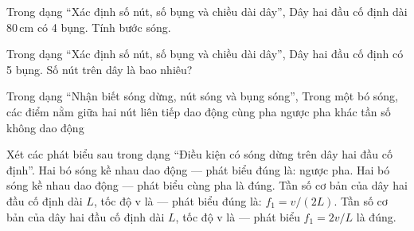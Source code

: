 \begin{ex}
Trong dạng “Xác định số nút, số bụng và chiều dài dây”, Dây hai đầu cố định dài $80\,\text{cm}$ có 4 bụng. Tính bước sóng.
\choiceTF

\end{ex}

\begin{ex}
Trong dạng “Xác định số nút, số bụng và chiều dài dây”, Dây hai đầu cố định có 5 bụng. Số nút trên dây là bao nhiêu?
\end{ex}

\begin{ex}
Trong dạng “Nhận biết sóng dừng, nút sóng và bụng sóng”, Trong một bó sóng, các điểm nằm giữa hai nút liên tiếp dao động
\choice
{\True cùng pha}
{ngược pha}
{khác tần số}
{không dao động}
\end{ex}

\begin{ex}
Xét các phát biểu sau trong dạng “Điều kiện có sóng dừng trên dây hai đầu cố định”.
\choiceTF
{\True Hai bó sóng kề nhau dao động — phát biểu đúng là: ngược pha.}
{Hai bó sóng kề nhau dao động — phát biểu cùng pha là đúng.}
{\True Tần số cơ bản của dây hai đầu cố định dài $L$, tốc độ v là — phát biểu đúng là: $f_1=v/(2L)$.}
{Tần số cơ bản của dây hai đầu cố định dài $L$, tốc độ v là — phát biểu $f_1=2v/L$ là đúng.}
\end{ex}


